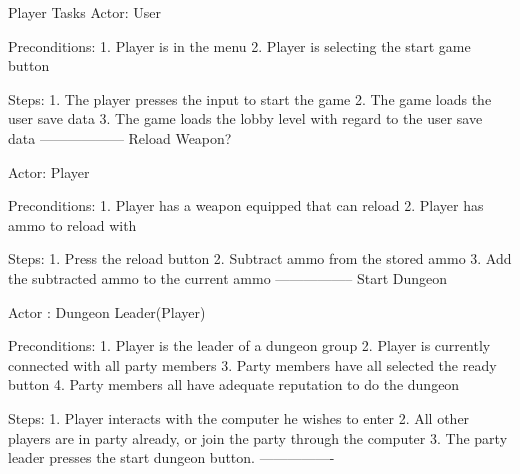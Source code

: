 \documentclass[12pt]{report}
\begin{document}
\begin{section}{Player Tasks}
Actor: User

Preconditions: 
1. Player is in the menu
2. Player is selecting the start game button

Steps:
1. The player presses the input to start the game
2. The game loads the user save data
3. The game loads the lobby level with regard to the user save data
------------------
Reload Weapon? %

Actor: Player

Preconditions: 
1. Player has a weapon equipped that can reload
2. Player has ammo to reload with

Steps:
1. Press the reload button
2. Subtract ammo from the stored ammo
3. Add the subtracted ammo to the current ammo
-----------------
Start Dungeon %

Actor : Dungeon Leader(Player)

Preconditions:
1. Player is the leader of a dungeon group
2. Player is currently connected with all party members
3. Party members have all selected the ready button
4. Party members all have adequate reputation to do the dungeon

Steps:
1. Player interacts with the computer he wishes to enter
2. All other players are in party already, or join the party through the computer
3. The party leader presses the start dungeon button.
----------------

\end{section}
\end{document}
